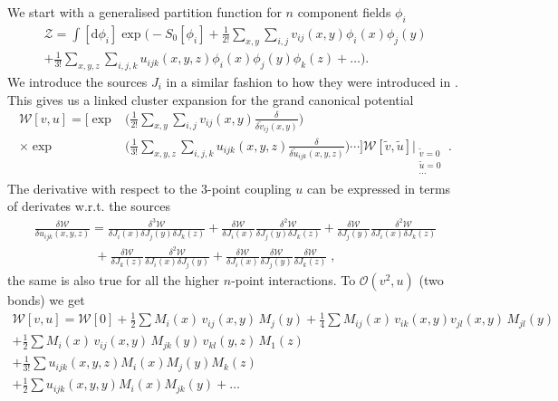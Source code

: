 We start with a generalised partition function for $n$ component fields $\phi_i$
%
\begin{multline} \label{eq:multi_point_scalar_Z}
  \mathcal{Z} = \int [\mathrm{d} \phi_i] \exp \bigg(-S_0[\phi_i]
  +\frac{1}{2!} \sum_{x,y} \sum_{i,j} v_{ij}(x,y) \phi_i(x) \phi_j(y) \\
  +\frac{1}{3!} \sum_{x,y,z} \sum_{i,j,k} u_{ijk}(x,y,z) \phi_i(x) \phi_j(y)
  \phi_k(z) + \dots \bigg).
\end{multline}
%
We introduce the sources $J_i$ in a similar fashion to how they were introduced
in . This gives us a linked cluster expansion for
the grand canonical potential
%
\begin{align}
  \mathcal{W}[v,u] = \bigg[ \exp&\bigg( \frac{1}{2!} \sum_{x,y} \sum_{i,j} v_{ij}(x,y) 
    \frac{\delta}{\delta \tilde{v}_{ij}(x,y)} \bigg)  \nonumber \\
  \times\exp&\bigg( \frac{1}{3!} \sum_{x,y,z} \sum_{i,j,k} u_{ijk}(x,y,z)
    \frac{\delta}{\delta \tilde{u}_{ijk}(x,y,z)} \bigg) \cdots
    \bigg] \mathcal{W}[\tilde{v},\tilde{u}] \Bigg|_{\substack{\tilde{v}=0\\\tilde{u}=0\\\cdots}}\;.
\end{align}
%
The derivative with respect to the 3-point coupling $u$ can be expressed in
terms of derivates w.r.t. the sources
%
\begin{multline}
  \frac{\delta \mathcal{W}}{\delta u_{ijk}(x,y,z)} = \frac{\delta^3 \mathcal{W}}{\delta J_i(x) \delta J_j(y) \delta J_k(z)}
    + \frac{\delta \mathcal{W}}{\delta J_i(x)} \frac{\delta^2 \mathcal{W}}{\delta J_j(y) \delta J_k(z)}
    + \frac{\delta \mathcal{W}}{\delta J_j(y)} \frac{\delta^2 \mathcal{W}}{\delta J_i(x) \delta J_k(z)} \\
  \hspace{2cm} + \frac{\delta \mathcal{W}}{\delta J_k(z)} \frac{\delta^2 \mathcal{W}}{\delta J_i(x) \delta J_j(y)}
    + \frac{\delta \mathcal{W}}{\delta J_i(x)} \frac{\delta \mathcal{W}}{\delta J_j(y)}
    \frac{\delta \mathcal{W}}{\delta J_k(z)}\;,
\end{multline}
%
the same is also true for all the higher $n$-point interactions. To
$\mathcal{O}(v^2, u)$ (two bonds) we get
%
{\allowdisplaybreaks%
\begin{multline} 
  \mathcal{W}[v,u] = \mathcal{W}[0] + \frac{1}{2} \sum M_i(x) \,v_{ij}(x,y)\, M_j(y)
  + \frac{1}{4} \sum M_{ij}(x) \,v_{ik}(x,y)v_{jl}(x,y)\, M_{jl}(y)\\
  + \frac{1}{2} \sum M_i(x) \,v_{ij}(x,y)\, M_{jk}(y) \,v_{kl}(y,z)\, M_1(z)\\
  + \frac{1}{3!} \sum u_{ijk}(x,y,z) M_i(x) M_j(y) M_k(z) \\
  + \frac{1}{2} \sum u_{ijk}(x,y,y) M_i(x) M_{jk}(y) + \dots
\end{multline}}%
